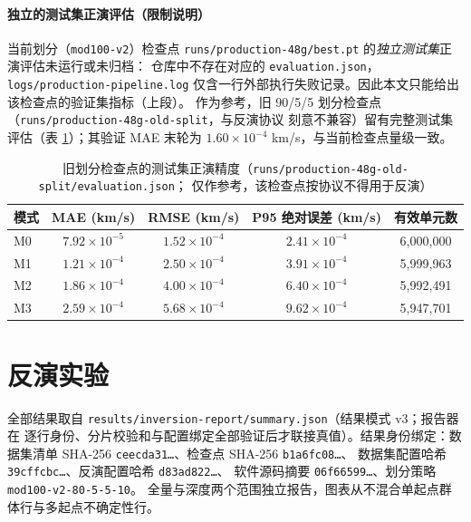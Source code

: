 \documentclass[UTF8,a4paper,11pt]{ctexart}
\begin{document}
\paragraph{独立的测试集正演评估（限制说明）} 当前划分（\texttt{mod100-v2}）检查点
\texttt{runs/}\allowbreak\texttt{production-48g/best.pt} 的\emph{独立测试集}正演评估未运行或未归档：
仓库中不存在对应的 \texttt{evaluation.json}，
\texttt{logs/}\allowbreak\texttt{production-pipeline.log}
仅含一行外部执行失败记录。因此本文只能给出该检查点的验证集指标（上段）。
作为参考，旧 90/5/5 划分检查点（\texttt{runs/}\allowbreak\texttt{production-48g-}\allowbreak\texttt{old-split}，与反演协议
刻意不兼容）留有完整测试集评估（表 \ref{tab:oldsplit-eval}）；其验证 MAE 末轮为
\(1.60\times10^{-4}\) km/s，与当前检查点量级一致。

\begin{table}[H]
\centering
\caption{旧划分检查点的测试集正演精度（\texttt{runs/production-48g-old-split/evaluation.json}；
仅作参考，该检查点按协议不得用于反演）}
\label{tab:oldsplit-eval}
\begin{tabular}{lcccc}
\toprule
模式 & MAE (km/s) & RMSE (km/s) & P95 绝对误差 (km/s) & 有效单元数 \\
\midrule
M0 & \(7.92\times10^{-5}\) & \(1.52\times10^{-4}\) & \(2.41\times10^{-4}\) & 6{,}000{,}000 \\
M1 & \(1.21\times10^{-4}\) & \(2.50\times10^{-4}\) & \(3.91\times10^{-4}\) & 5{,}999{,}963 \\
M2 & \(1.86\times10^{-4}\) & \(4.00\times10^{-4}\) & \(6.40\times10^{-4}\) & 5{,}992{,}491 \\
M3 & \(2.59\times10^{-4}\) & \(5.68\times10^{-4}\) & \(9.62\times10^{-4}\) & 5{,}947{,}701 \\
\bottomrule
\end{tabular}
\end{table}

\section{反演实验}\label{sec:inversion}
全部结果取自 \texttt{results/inversion-report/summary.json}（结果模式 v3；报告器在
逐行身份、分片校验和与配置绑定全部验证后才联接真值）。结果身份绑定：数据集清单
SHA-256 \texttt{ceecda31\ldots}、检查点 SHA-256 \texttt{b1a6fc08\ldots}、
数据集配置哈希 \texttt{39cffcbc\ldots}、反演配置哈希 \texttt{d83ad822\ldots}、
软件源码摘要 \texttt{06f66599\ldots}、划分策略 \texttt{mod100-v2-80-5-5-10}。
全量与深度两个范围独立报告，图表从不混合单起点群体行与多起点不确定性行。
\end{document}
